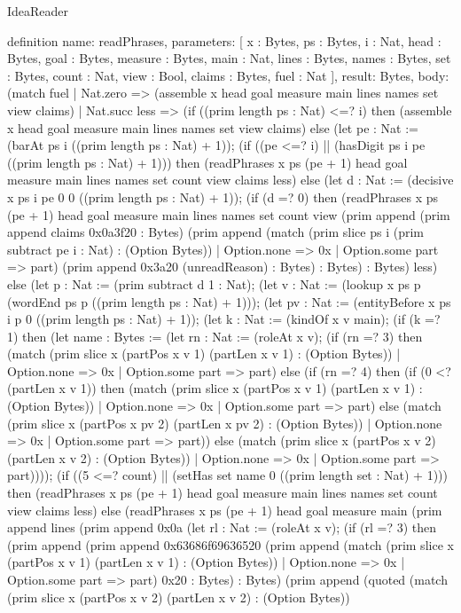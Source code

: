 \begin{lexlean}{IdeaReader}
\begin{semanticmodule}
definition{
  name: readPhrases,
  parameters: [
    x : Bytes,
    ps : Bytes,
    i : Nat,
    head : Bytes,
    goal : Bytes,
    measure : Bytes,
    main : Nat,
    lines : Bytes,
    names : Bytes,
    set : Bytes,
    count : Nat,
    view : Bool,
    claims : Bytes,
    fuel : Nat
  ],
  result: Bytes,
  body: (match fuel
    | Nat.zero => (assemble x head goal measure main lines names set view claims)
    | Nat.succ less => (if ((prim length ps : Nat) <=? i) then (assemble x head goal measure main lines names set view claims) else (let pe : Nat := (barAt ps i ((prim length ps : Nat) + 1)); (if ((pe <=? i) || (hasDigit ps i pe ((prim length ps : Nat) + 1))) then (readPhrases x ps (pe + 1) head goal measure main lines names set count view claims less) else (let d : Nat := (decisive x ps i pe 0 0 ((prim length ps : Nat) + 1)); (if (d =? 0) then (readPhrases x ps (pe + 1) head goal measure main lines names set count view (prim append (prim append claims 0x0a3f20 : Bytes) (prim append (match (prim slice ps i (prim subtract pe i : Nat) : (Option Bytes))
      | Option.none => 0x
      | Option.some part => part) (prim append 0x3a20 (unreadReason) : Bytes) : Bytes) : Bytes) less) else (let p : Nat := (prim subtract d 1 : Nat); (let v : Nat := (lookup x ps p (wordEnd ps p ((prim length ps : Nat) + 1))); (let pv : Nat := (entityBefore x ps i p 0 ((prim length ps : Nat) + 1)); (let k : Nat := (kindOf x v main); (if (k =? 1) then (let name : Bytes := (let rn : Nat := (roleAt x v); (if (rn =? 3) then (match (prim slice x (partPos x v 1) (partLen x v 1) : (Option Bytes))
      | Option.none => 0x
      | Option.some part => part) else (if (rn =? 4) then (if (0 <? (partLen x v 1)) then (match (prim slice x (partPos x v 1) (partLen x v 1) : (Option Bytes))
      | Option.none => 0x
      | Option.some part => part) else (match (prim slice x (partPos x pv 2) (partLen x pv 2) : (Option Bytes))
      | Option.none => 0x
      | Option.some part => part)) else (match (prim slice x (partPos x v 2) (partLen x v 2) : (Option Bytes))
      | Option.none => 0x
      | Option.some part => part)))); (if ((5 <=? count) || (setHas set name 0 ((prim length set : Nat) + 1))) then (readPhrases x ps (pe + 1) head goal measure main lines names set count view claims less) else (readPhrases x ps (pe + 1) head goal measure main (prim append lines (prim append 0x0a (let rl : Nat := (roleAt x v); (if (rl =? 3) then (prim append (prim append 0x63686f69636520 (prim append (match (prim slice x (partPos x v 1) (partLen x v 1) : (Option Bytes))
      | Option.none => 0x
      | Option.some part => part) 0x20 : Bytes) : Bytes) (prim append (quoted (match (prim slice x (partPos x v 2) (partLen x v 2) : (Option Bytes))
}
\end{semanticmodule}
\end{lexlean}
